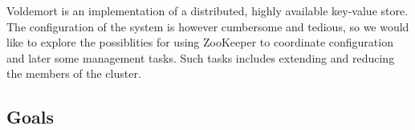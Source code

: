 
\begin{introduction}
Voldemort is an implementation of a distributed, highly available key-value store.
The configuration of the system is however cumbersome and tedious, so we would like to explore the possiblities for using ZooKeeper to coordinate configuration and later some management tasks.
Such tasks includes extending and reducing the members of the cluster.

\subsection{Goals}

\subsection{}

\end{introduction}